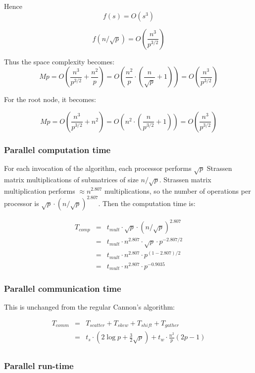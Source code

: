 \documentclass{article}
\begin{document}
Hence
$$f(s) = O(s^3)$$

	
$$f(n/\sqrt{p}) = O\left(\frac{n^3}{p^{3/2}}\right)$$

Thus the space complexity becomes:
$$Mp = O\left(\frac{n^3}{p^{3/2}} + \frac{n^2}{p}\right) = O\left(\frac{n^2}{p} \cdot \left(\frac{n}{\sqrt{p}}+1\right)\right) = O\left(\frac{n^3}{p^{3/2}}\right)$$

For the root node, it becomes:

$$Mp = O\left(\frac{n^3}{p^{3/2}} + n^2\right) = O\left(n^2 \cdot \left(\frac{n}{p^{3/2}} + 1\right)\right) = O\left(\frac{n^3}{p^{3/2}}\right)$$


\subsubsection{Parallel computation time}

For each invocation of the algorithm, each processor performs $\sqrt{p}$ Strassen
matrix multiplications of submatrices of size $n/\sqrt{p}$. Strassen matrix
multiplication performs $\approx n^{2.807}$ multiplications, so the number of
operations per processor is $\sqrt{p} \cdot (n/\sqrt{p})^{2.807}$. Then the computation time is:

\begin{eqnarray*}
T_{{comp}} &=& t_{{mult}} \cdot \sqrt{p} \cdot (n/\sqrt{p})^{2.807} \\
&=& t_{{mult}} \cdot n^{2.807} \cdot \sqrt{p} \cdot  p^{-2.807/2} \\
&=& t_{{mult}} \cdot n^{2.807} \cdot  p^{(1-2.807)/2} \\
&=& t_{{mult}} \cdot n^{2.807} \cdot  p^{-0.9035}
\end{eqnarray*}

\subsubsection{Parallel communication time}

This is unchanged from the regular Cannon's algorithm:

\begin{eqnarray*}
T_{{comm}} 	&=& T_{{scatter}} + T_{{skew}} + T_{{shift}} + T_{{gather}} \\
			&=& t_s \cdot \left(2 \log{p} + \frac{3}{2}\sqrt{p}\right) + t_w \cdot \frac{n^2}{p}(2p-1) \\
\end{eqnarray*}

\subsubsection{Parallel run-time}
\end{document}
